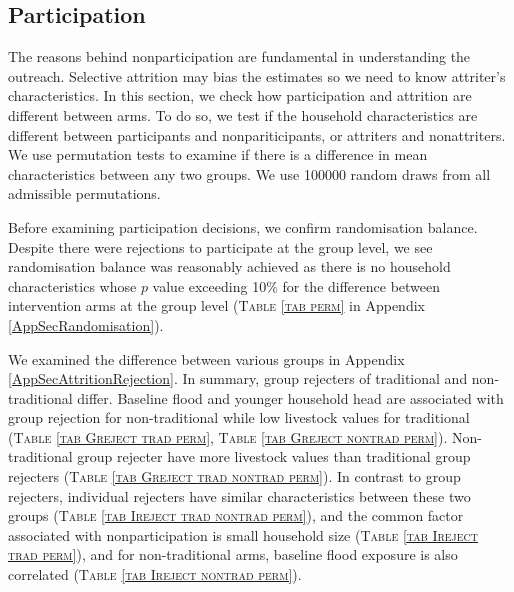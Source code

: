 \subsection{Participation}

	The reasons behind nonparticipation are fundamental in understanding the outreach. Selective attrition may bias the estimates so we need to know attriter's characteristics. In this section, we check how participation and attrition are different between arms. To do so, we test if the household characteristics are different between participants and nonpariticipants, or attriters and nonattriters. We use permutation tests to examine if there is a difference in mean characteristics between any two groups. We use 100000 random draws from all admissible permutations.

	Before examining participation decisions, we confirm randomisation balance. Despite there were rejections to participate at the group level, we see randomisation balance was reasonably achieved as there is no household characteristics whose $p$ value exceeding 10\% for the difference between intervention arms at the group level (\textsc{\normalsize Table \ref{tab perm}} in Appendix \ref{AppSecRandomisation}).

	We examined the difference between various groups in Appendix \ref{AppSecAttritionRejection}. In summary, group rejecters of \textsf{traditional} and non-\textsf{traditional} differ. Baseline flood and younger household head are associated with group rejection for non-\textsf{traditional} while low livestock values for \textsf{traditional} (\textsc{\normalsize Table \ref{tab Greject trad perm}}, \textsc{\normalsize Table \ref{tab Greject nontrad perm}}). Non-\textsf{traditional} group rejecter have more livestock values than \textsf{traditional} group rejecters (\textsc{\normalsize Table \ref{tab Greject trad nontrad perm}}). In contrast to group rejecters, individual rejecters have similar characteristics between these two groups (\textsc{\normalsize Table \ref{tab Ireject trad nontrad perm}}), and the common factor associated with nonparticipation is small household size (\textsc{\normalsize Table \ref{tab Ireject trad perm}}), and for non-\textsf{traditional} arms, baseline flood exposure is also correlated (\textsc{\normalsize Table \ref{tab Ireject nontrad perm}}).

